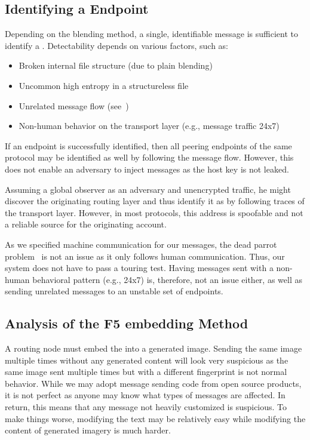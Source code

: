 \subsection{Identifying a \VortexMessage{} Endpoint}
Depending on the blending method, a single, identifiable message is sufficient to identify a \VortexNode. Detectability depends on various factors, such as:

\begin{itemize}
	\item Broken internal file structure (due to plain blending)
	\item Uncommon high entropy in a structureless file
	\item Unrelated message flow (see~\cite{oakland2013-parrot})
	\item Non-human behavior on the transport layer (e.g., message traffic 24x7)
\end{itemize}

If an endpoint is successfully identified, then all peering endpoints of the same protocol may be identified as well by following the message flow. However, this does not enable an adversary to inject messages as the host key is not leaked. 

Assuming a global observer as an adversary and unencrypted traffic, he might discover the originating routing layer and thus identify it as \VortexNode{} by following traces of the transport layer. However, in most protocols, this address is spoofable and not a reliable source for the originating account.

As we specified machine communication for our messages, the dead parrot problem~\cite{oakland2013-parrot} is not an issue as it only follows human communication. Thus, our system does not have to pass a touring test. Having messages sent with a non-human behavioral pattern (e.g., 24x7) is, therefore, not an issue either, as well as sending unrelated messages to an unstable set of endpoints. 

\subsection{Analysis of the F5 embedding Method}
A routing node must embed the \VortexMessage{} into a generated image. Sending the same image multiple times without any generated content will look very suspicious as the same image sent multiple times but with a different fingerprint is not normal behavior. While we may adopt message sending code from open source products, it is not perfect as anyone may know what types of messages are affected. In return, this means that any message not heavily customized is suspicious. To make things worse, modifying the text may be relatively easy while modifying the content of generated imagery is much harder.

